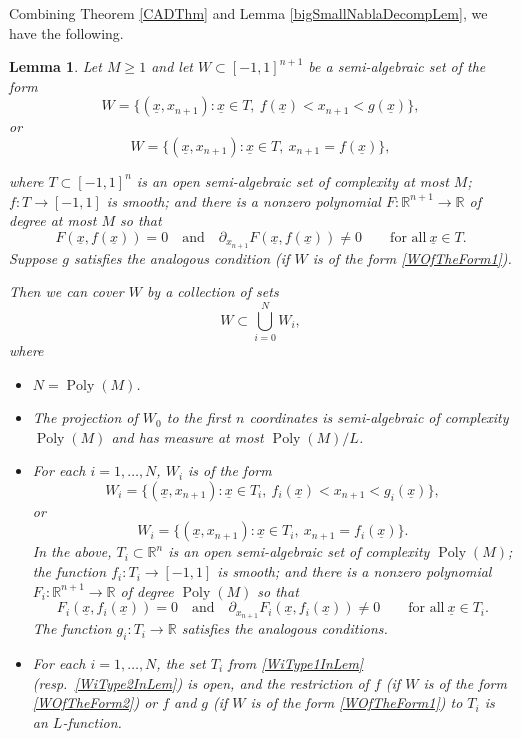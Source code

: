 \documentclass[letterpaper, reqno,11pt]{article}
\numberwithin{equation}{section}
\newcommand{\RR}{\mathbb{R}}
\newcommand{\poly}{\operatorname{Poly}}
\numberwithin{thm}{section}
\newtheorem{lem}[thm]{Lemma}
\theoremstyle{remark}
\begin{document}
Combining Theorem \ref{CADThm} and Lemma \ref{bigSmallNablaDecompLem}, we have the following.
\begin{lem}\label{oneStageDecompSets}
Let $M\geq 1$ and let $W\subset [-1,1]^{n+1}$ be a semi-algebraic set of the form
\begin{equation}\label{WOfTheForm1}
W = \{(\underline x, x_{n+1})\colon \underline x \in T,\ f(\underline x)< x_{n+1} < g(\underline x)\},
\end{equation}
or
\begin{equation}\label{WOfTheForm2}
W = \{(\underline x, x_{n+1})\colon \underline x \in T,\ x_{n+1} = f(\underline x)\},
\end{equation}

where $T\subset [-1,1]^n$ is an open semi-algebraic set of complexity at most $M$; $f\colon T\to[-1,1]$ is smooth; and there is a nonzero polynomial $F\colon\RR^{n+1}\to\RR$ of degree at most $M$ so that
\[
F(\underline x, f(\underline x))=0\quad \textrm{and}\quad \partial_{x_{n+1}}F(\underline x, f(\underline x))\neq 0\qquad\textrm{for all}\ \underline x\in T.
\] 
Suppose $g$ satisfies the analogous condition (if $W$ is of the form \eqref{WOfTheForm1}).

Then we can cover $W$ by a collection of sets
\[
W \subset\bigcup_{i=0}^N W_i,
\]
where 
\begin{itemize}
\item[(i)] $N = \poly(M)$.
%
\item[(ii)] The projection of $W_0$ to the first $n$ coordinates is semi-algebraic of complexity $\poly(M)$ and has measure at most $\poly(M)/L$.
%
\item[(iii)] For each $i=1,\ldots,N$, $W_i$ is of the form
\begin{equation}\label{WiType1InLem}
W_i = \big\{(\underline x, x_{n+1})\colon \underline x \in T_i,\ f_i(\underline x) < x_{n+1} < g_i(\underline x)\big\},
\end{equation}
or
\begin{equation}\label{WiType2InLem}
W_i = \big\{(\underline x, x_{n+1})\colon \underline x \in T_i,\ x_{n+1}=f_i(\underline x)\big\}.
\end{equation}
In the above, $T_i\subset\RR^n$ is an open semi-algebraic set of complexity $\poly(M)$; the function $f_i\colon T_i\to[-1,1]$ is smooth; and there is a nonzero polynomial $F_i\colon\RR^{n+1}\to\RR$ of degree $\poly(M)$ so that
\[
F_i(\underline x, f_i(\underline x))=0\quad \textrm{and}\quad \partial_{x_{n+1}}F_i(\underline x, f_i(\underline x))\neq 0\qquad\textrm{for all}\ \underline x\in T_i.
\] 
The function $g_i\colon T_i\to\RR$ satisfies the analogous conditions. 
%
\item[(iv)] For each $i=1,\ldots,N$, the set $T_i$ from \eqref{WiType1InLem} (resp.~\eqref{WiType2InLem}) is open, and the restriction of $f$ (if $W$ is of the form \eqref{WOfTheForm2}) or $f$ and $g$ (if $W$ is of the form \eqref{WOfTheForm1}) to $T_i$ is an $L$-function. 
\end{itemize}
\end{lem}
\end{document}
